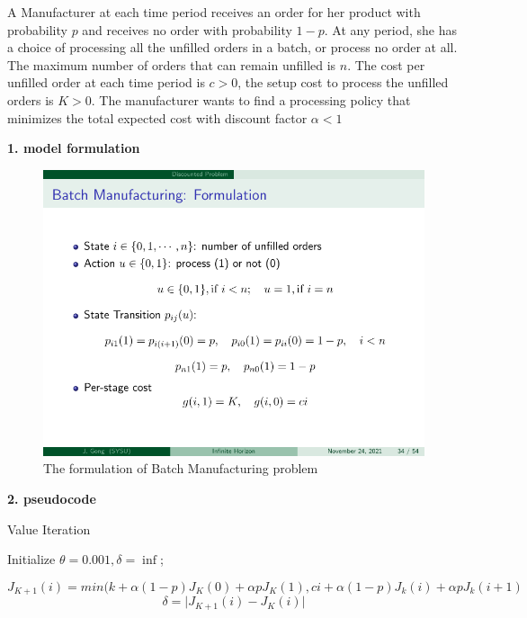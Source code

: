 \documentclass{assignment}
\date{Dec 30, 2021}
\begin{document}

\begin{problemlist}
\pbitem 
A Manufacturer at each time period receives an order for 
her product with probability $p$ and receives no order with 
probability $1-p$.
At any period, she has a choice of processing all the unfilled orders 
in a batch, or process no order at all. The maximum number of orders that 
can remain unfilled is $n$.
The cost per unfilled order at each time period is $c > 0$, 
the setup cost to process the unfilled orders is $K > 0$.
The manufacturer wants to find a processing policy that minimizes 
the total expected cost with discount factor $\alpha<1$

\begin{problem}
\begin{answer}
  \vspace{-1cm}
\begin{flushleft}
  \large\textbf{1. model formulation}
\end{flushleft}
\begin{figure}[htb]
  \centering
  \includegraphics[width=0.7\linewidth]{figure/formulation.pdf}
  \caption{The formulation of Batch Manufacturing problem}
\end{figure}

\begin{flushleft}
  \large\textbf{2. pseudocode}
\end{flushleft}

\begin{algorithm}[h]
  \caption{Value Iteration}
	\BlankLine
	Initialize $\theta=0.001, \delta=\inf$;
	
	\While{\textnormal{$\delta>\theta$}}
  {
    {
      $$J_{K+1}(i)=min⁡(k+\alpha(1-p) J_K (0)+\alpha pJ_K (1),c i+\alpha(1-p) J_k (i)+\alpha pJ_k (i+1)$$
			$$δ=\lvert J_{K+1} (i)-J_K (i) \rvert$$

}}
\end{algorithm}
\end{answer}
\end{problem}
\end{problemlist}
\end{document}
